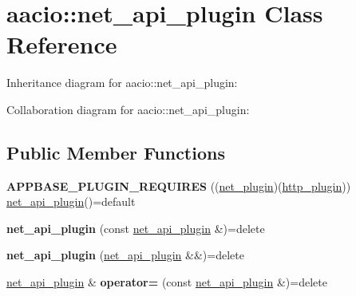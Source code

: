 \hypertarget{classaacio_1_1net__api__plugin}{}\section{aacio\+:\+:net\+\_\+api\+\_\+plugin Class Reference}
\label{classaacio_1_1net__api__plugin}


Inheritance diagram for aacio\+:\+:net\+\_\+api\+\_\+plugin\+:


Collaboration diagram for aacio\+:\+:net\+\_\+api\+\_\+plugin\+:
\subsection*{Public Member Functions}
\begin{DoxyCompactItemize}
\item 
\mbox{\label{classaacio_1_1net__api__plugin_a6e5046f96ccd7715dccbead7cc722b54}} 
{\bfseries A\+P\+P\+B\+A\+S\+E\+\_\+\+P\+L\+U\+G\+I\+N\+\_\+\+R\+E\+Q\+U\+I\+R\+ES} ((\mbox{\hyperlink{classaacio_1_1net__plugin}{net\+\_\+plugin}})(\mbox{\hyperlink{classaacio_1_1http__plugin}{http\+\_\+plugin}})) \mbox{\hyperlink{classaacio_1_1net__api__plugin}{net\+\_\+api\+\_\+plugin}}()=default
\item 
\mbox{\label{classaacio_1_1net__api__plugin_a96f1e6ddfd52eb8ee3cf24c9188de8e5}} 
{\bfseries net\+\_\+api\+\_\+plugin} (const \mbox{\hyperlink{classaacio_1_1net__api__plugin}{net\+\_\+api\+\_\+plugin}} \&)=delete
\item 
\mbox{\label{classaacio_1_1net__api__plugin_a6f1ac86c3a348fd06a307f6a4e33347e}} 
{\bfseries net\+\_\+api\+\_\+plugin} (\mbox{\hyperlink{classaacio_1_1net__api__plugin}{net\+\_\+api\+\_\+plugin}} \&\&)=delete
\item 
\mbox{\label{classaacio_1_1net__api__plugin_ad9244e2e42f14c2c3910be85932b34f0}} 
\mbox{\hyperlink{classaacio_1_1net__api__plugin}{net\+\_\+api\+\_\+plugin}} \& {\bfseries operator=} (const \mbox{\hyperlink{classaacio_1_1net__api__plugin}{net\+\_\+api\+\_\+plugin}} \&)=delete
\item 
\mbox{\label{classaacio_1_1net__api__plugin_a86ae5717f1829d282a97581a9ddbda46}} 

\end{DoxyCompactItemize}
